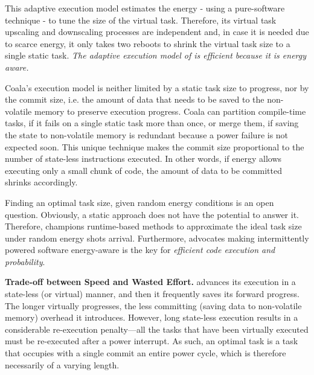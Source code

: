 This adaptive execution model estimates the energy - using a pure-software technique - to tune the size of the virtual task. Therefore, its virtual task upscaling and downscaling processes are independent and, in case it is needed due to scarce energy, it only takes two reboots to shrink the virtual task size to a single static task. \emph{The adaptive execution model of \sys is efficient because it is energy aware.}

Coala's execution model is neither limited by a static task size to progress, nor by the commit size, i.e. the amount of data that needs to be saved to the non-volatile memory to preserve execution progress. Coala can partition compile-time tasks, if it fails on a single static task more than once, or merge them, if saving the state to non-volatile memory is redundant because a power failure is not expected soon. This unique technique makes the commit size proportional to the number of state-less instructions executed. In other words, if energy allows executing only a small chunk of code, the amount of data to be committed shrinks accordingly.



Finding an optimal task size, given random energy conditions is an open question. Obviously, a static approach does not have the potential to answer it. Therefore, \sys champions runtime-based methods to approximate the ideal task size under random energy shots arrival. Furthermore, \sys advocates making intermittently powered software energy-aware is the key for \emph{efficient code execution and probability}. 

\textbf{Trade-off between Speed and Wasted Effort.} \sys advances its execution in a state-less (or virtual) manner, and then it frequently saves its forward progress. The longer \sys virtually progresses, the less committing (saving data to non-volatile memory) overhead it introduces. However, long state-less execution results in a considerable re-execution penalty---all the tasks that have been virtually executed must be re-executed after a power interrupt. As such, an optimal task is a task that occupies with a single commit an entire power cycle, which is therefore necessarily of a varying length.  


